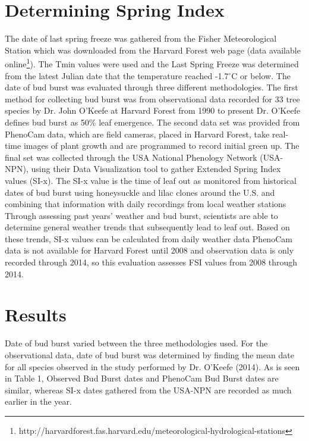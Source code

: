 \documentclass{article}\usepackage[]{graphicx}\usepackage[]{color}
\begin{document}
\section*{Determining Spring Index}
The date of last spring freeze was gathered from the Fisher Meteorological Station which was downloaded from the Harvard Forest web page (data available online\footnote{http://harvardforest.fas.harvard.edu/meteorological-hydrological-stations}). The Tmin values were used and the Last Spring Freeze was  determined from the latest Julian date that the temperature reached -1.7$^{\circ}$C or below. The date of bud burst was evaluated through three different methodologies. The first method for collecting bud burst was from observational data recorded for 33 tree species by Dr. John O'Keefe at Harvard Forest from 1990 to present %
Dr. O'Keefe defines bud burst as 50\% leaf emergence. The second data set was provided from PhenoCam data, which are field cameras, placed in Harvard Forest, take real-time images of plant growth and are programmed to record initial green up. The final set was collected through the USA National Phenology Network (USA-NPN), using their Data Visualization tool to gather Extended Spring Index values (SI-x). The SI-x value is the time of leaf out as monitored from historical dates of bud burst using honeysuckle and lilac clones around the U.S. and combining that information with daily recordings from local weather stations %
Through assessing past years' weather and bud burst, scientists are able to determine general weather trends that subsequently lead to leaf out. Based on these trends, SI-x values can be calculated from daily weather data %
\newline
PhenoCam data is not available for Harvard Forest until 2008 and observation data is only recorded through 2014, so this evaluation assesses FSI values from 2008 through 2014. 
\section*{Results}
Date of bud burst varied between the three methodologies used. For the observational data, date of bud burst was determined by finding the mean date for all species observed in the study performed by Dr. O'Keefe (2014). %
As is seen in Table 1, Observed Bud Burst dates and PhenoCam Bud Burst dates are similar, whereas SI-x dates gathered from the USA-NPN are recorded as much earlier in the year.
\end{document}
